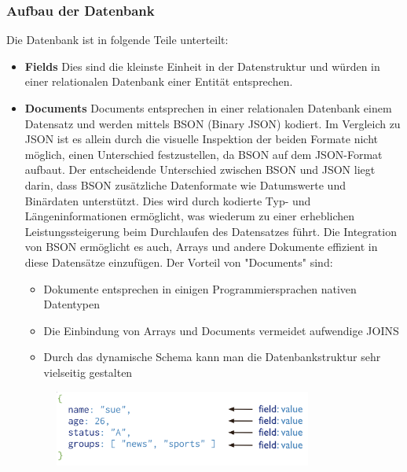 \subsubsection{Aufbau der Datenbank}
Die Datenbank ist in folgende Teile unterteilt:

\begin{itemize}
    \item \textbf{Fields}
        \newline
        Dies sind die kleinste Einheit in der Datenstruktur und würden in einer relationalen Datenbank einer Entität entsprechen.
    \item \textbf{Documents}
        \newline
        Documents entsprechen in einer relationalen Datenbank einem Datensatz und werden mittels BSON (Binary JSON) kodiert. Im Vergleich zu JSON ist es allein durch die visuelle Inspektion der beiden Formate nicht möglich, einen Unterschied festzustellen, da BSON auf dem JSON-Format aufbaut.
        \newline
        Der entscheidende Unterschied zwischen BSON und JSON liegt darin, dass BSON zusätzliche Datenformate wie Datumswerte und Binärdaten unterstützt. Dies wird durch kodierte Typ- und Längeninformationen ermöglicht, was wiederum zu einer erheblichen Leistungssteigerung beim Durchlaufen des Datensatzes führt. Die Integration von BSON ermöglicht es auch, Arrays und andere Dokumente effizient in diese Datensätze einzufügen.
        \newline
        Der Vorteil von "Documents" sind:
        \begin{itemize}
            \item Dokumente entsprechen in einigen Programmiersprachen nativen Datentypen
            \item Die Einbindung von Arrays und Documents vermeidet aufwendige JOINS
            \item Durch das dynamische Schema kann man die Datenbankstruktur sehr vielseitig gestalten
        \end{itemize}
        \begin{figure}[h!]
            \centering
            \includegraphics[width=0.8\textwidth]{pics/document.png}

\end{figure}
\end{itemize}
